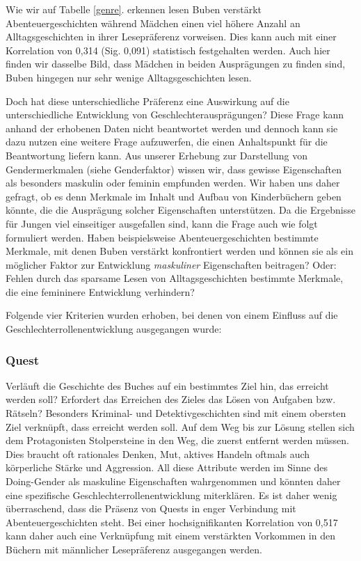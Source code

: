 Wie wir auf Tabelle \ref{genre}. erkennen lesen Buben verstärkt
Abenteuergeschichten während Mädchen einen viel höhere Anzahl an
Alltagsgeschichten in ihrer Lesepräferenz vorweisen. Dies kann auch mit
einer Korrelation von 0,314 (Sig. 0,091) statistisch festgehalten
werden. Auch hier finden wir dasselbe Bild, dass Mädchen in beiden
Ausprägungen zu finden sind, Buben hingegen nur sehr wenige
Alltagsgeschichten lesen.

Doch hat diese unterschiedliche Präferenz eine Auswirkung auf die
unterschiedliche Entwicklung von Geschlechterausprägungen? Diese Frage
kann anhand der erhobenen Daten nicht beantwortet werden und dennoch
kann sie dazu nutzen eine weitere Frage aufzuwerfen, die einen
Anhaltspunkt für die Beantwortung liefern kann. Aus unserer Erhebung zur
Darstellung von Gendermerkmalen (siehe Genderfaktor) wissen wir, dass
gewisse Eigenschaften als besonders maskulin oder feminin empfunden
werden. Wir haben uns daher gefragt, ob es denn Merkmale im Inhalt und
Aufbau von Kinderbüchern geben könnte, die die Ausprägung solcher
Eigenschaften unterstützen. Da die Ergebnisse für Jungen viel
einseitiger ausgefallen sind, kann die Frage auch wie folgt formuliert
werden. Haben beispielsweise Abenteuergeschichten bestimmte Merkmale,
mit denen Buben verstärkt konfrontiert werden und können sie als ein
möglicher Faktor zur Entwicklung \emph{maskuliner} Eigenschaften
beitragen? Oder: Fehlen durch das sparsame Lesen von Alltagsgeschichten
bestimmte Merkmale, die eine femininere Entwicklung verhindern?

Folgende vier Kriterien wurden erhoben, bei denen von einem Einfluss auf
die Geschlechterrollenentwicklung ausgegangen wurde:

\subsubsection{Quest}

Verläuft die Geschichte des Buches auf ein bestimmtes Ziel hin, das
erreicht werden soll? Erfordert das Erreichen des Zieles das Lösen von
Aufgaben bzw. Rätseln? Besonders Kriminal- und Detektivgeschichten sind
mit einem obersten Ziel verknüpft, dass erreicht werden soll. Auf dem
Weg bis zur Lösung stellen sich dem Protagonisten Stolpersteine in den
Weg, die zuerst entfernt werden müssen. Dies braucht oft rationales
Denken, Mut, aktives Handeln oftmals auch körperliche Stärke und
Aggression. All diese Attribute werden im Sinne des Doing-Gender als
maskuline Eigenschaften wahrgenommen und könnten daher eine spezifische
Geschlechterrollenentwicklung miterklären. Es ist daher wenig
überraschend, dass die Präsenz von Quests in enger Verbindung mit
Abenteuergeschichten steht. Bei einer hochsignifikanten Korrelation von
0,517 kann daher auch eine Verknüpfung mit einem verstärkten Vorkommen
in den Büchern mit männlicher Lesepräferenz ausgegangen werden.

